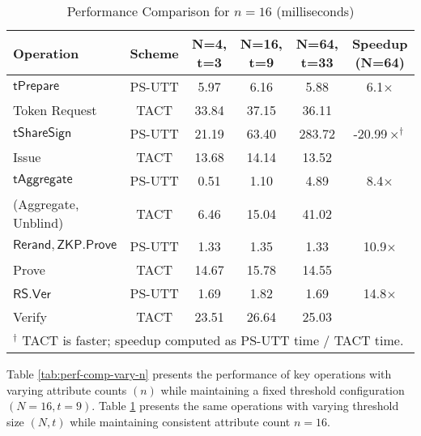 \begin{table}[htbp]
\centering
\caption[Threshold ABC Performance Comparison, fixed attribute length, varying number of nodes]{Performance Comparison for $n = 16$ (milliseconds)}
\begin{tabular}{lccccc}
\toprule
\textbf{Operation} & \textbf{Scheme} & \textbf{N=4, t=3} & \textbf{N=16, t=9} & \textbf{N=64, t=33} & \textbf{Speedup (N=64)} \\
\midrule
$\mathsf{tPrepare}$ & PS-UTT & 5.97 & 6.16 & 5.88 & 6.1$\times$ \\
Token Request              & TACT   & 33.84 & 37.15 & 36.11 & \\
\midrule
$\mathsf{tShareSign}$         & PS-UTT & 21.19 & 63.40 & 283.72 & -20.99$\times^\dagger$ \\
Issue              & TACT   & 13.68 & 14.14 & 13.52 & \\
\midrule
$\mathsf{tAggregate}$ & PS-UTT & 0.51 & 1.10 & 4.89 & 8.4$\times$ \\
(Aggregate, Unblind)                     & TACT   & 6.46 & 15.04 & 41.02 & \\
\midrule
$\mathsf{Rerand, ZKP.Prove}$         & PS-UTT & 1.33 & 1.35 & 1.33 & 10.9$\times$\\
Prove              & TACT   & 14.67 & 15.78 & 14.55 & \\
\midrule
$\mathsf{RS.Ver}$        & PS-UTT & 1.69 & 1.82 & 1.69 & 14.8$\times$ \\
Verify              & TACT   & 23.51 & 26.64 & 25.03 & \\
\bottomrule
\multicolumn{6}{l}{\small $^\dagger$ TACT is faster; speedup computed as PS-UTT time / TACT time.}
\end{tabular}
\label{tab:perf-comp-vary-N}

\end{table}


Table \ref{tab:perf-comp-vary-n} presents the performance of key operations with varying attribute counts $(n)$ while maintaining a fixed threshold configuration $(N=16, t=9)$. Table \ref{tab:perf-comp-vary-N} presents the same operations with varying threshold size $(N, t)$ while maintaining consistent attribute count $n = 16$. 






